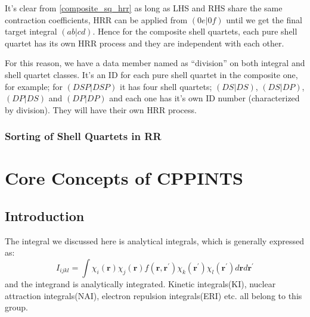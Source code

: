 It's clear from \ref{composite_sq_hrr} as long as LHS and RHS share the 
same contraction coefficients, HRR can be applied from $(0e|0f)$ until
we get the final target integral $(ab|cd)$. Hence for the composite 
shell quartets, each pure shell quartet has its own HRR process and they
are independent with each other.

For this reason, we have a data member named as ``division'' on both
integral and shell quartet classes. It's an ID for each pure shell quartet
in the composite one, for example; for $(DSP|DSP)$ it has four shell quartets;
$(DS|DS)$, $(DS|DP)$, $(DP|DS)$ and $(DP|DP)$ and each one has it's 
own ID number (characterized by division). They will have their own
HRR process.

\subsection{Sorting of Shell Quartets in RR}
%
%



\chapter{Core Concepts of CPPINTS}

\section{Introduction}
\label{concepts_introduction}

The integral we discussed here is analytical integrals,
which is generally expressed as:
\begin{equation}\label{int_paper:1}
  I_{ijkl} = \int \chi_{i}(\bm{r})\chi_{j}(\bm{r})f(\bm{r},\bm{r^{'}})
\chi_{k}(\bm{r^{'}})\chi_{l}(\bm{r^{'}}) d\bm{r} d\bm{r^{'}}
\end{equation}
and the integrand is analytically integrated. Kinetic integrals(KI),
nuclear attraction integrals(NAI), electron repulsion integrals(ERI) etc. all 
belong to this group. 


